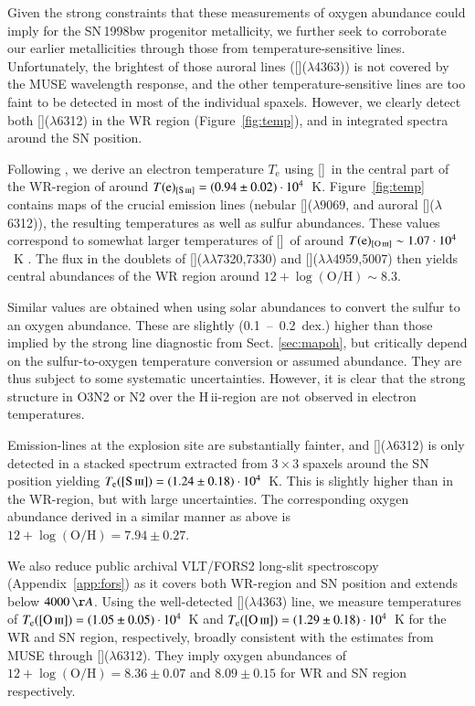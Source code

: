 \documentclass[traditabstract]{aa}
\newcommand{\hii}{\mbox{H\,{\sc ii}}}
\newcommand{\oh}{12+\log(\mathrm{O/H})}
\newcommand{\siii}{[\ion{S}{iii}]}
\newcommand{\oii}{[\ion{O}{ii}]}
\newcommand{\oiii}{[\ion{O}{iii}]}
\begin{document}
Given the strong constraints that these measurements of oxygen abundance could imply for the SN\,1998bw progenitor metallicity, we further seek to corroborate our earlier metallicities through those from temperature-sensitive lines. Unfortunately, the brightest of those auroral lines (\oiii($\lambda$4363)) is not covered by the MUSE wavelength response, and the other temperature-sensitive lines are too faint to be detected in most of the individual spaxels. However, we clearly detect both \siii($\lambda$6312) in the WR region (Figure~\ref{fig:temp}), and in integrated spectra around the SN position.



Following \citet{2013ApJS..207...21N}, we derive an electron temperature $T_{\mathrm{e}}$ using \siii\, in the central part of the WR-region of around $T(\mathrm{e})_{\siii}=(0.94\pm0.02)\cdot10^{4}$~K. Figure~\ref{fig:temp} contains maps of the crucial emission lines (nebular \siii($\lambda9069$, and auroral \siii($\lambda$6312)), the resulting temperatures as well as sulfur abundances. These values correspond to somewhat larger temperatures of \oiii~of around $T(\mathrm{e})_{\oiii} \sim 1.07\cdot10^{4}$~K \citep{2006A&A...448..955I, 2012A&A...547A..29B}. The flux in the doublets of \oii($\lambda\lambda$7320,7330) and \oiii($\lambda\lambda$4959,5007) then yields central abundances of the WR region around $\oh \sim 8.3$.

Similar values are obtained when using solar abundances to convert the sulfur to an oxygen abundance. These are slightly (0.1~--~0.2~dex.) higher than those implied by the strong line diagnostic from Sect. \ref{sec:mapoh}, but critically depend on the sulfur-to-oxygen temperature conversion or assumed abundance. They are thus subject to some systematic uncertainties. However, it is clear that the strong structure in O3N2 or N2 over the \hii-region are not observed in electron temperatures.

Emission-lines at the explosion site are substantially fainter, and \siii($\lambda$6312) is only detected in a stacked spectrum extracted from $3\times3$ spaxels around the SN position yielding $T_{\mathrm{e}}(\siii)=(1.24\pm0.18)\cdot10^{4}$~K. This is slightly higher than in the WR-region, but with large uncertainties. The corresponding oxygen abundance derived in a similar manner as above is $\oh=7.94\pm0.27$.

We also reduce public archival VLT/FORS2 long-slit spectroscopy (Appendix~\ref{app:fors}) as it covers both WR-region and SN position and extends below $4000\,\AA$. Using the well-detected \oiii($\lambda$4363) line, we measure temperatures of $T_{\mathrm{e}}(\oiii)=(1.05\pm0.05)\cdot 10^{4}$~K and $T_{\mathrm{e}}(\oiii)=(1.29\pm0.18)\cdot10^{4}$~K for the WR and SN region, respectively, broadly consistent with the estimates from MUSE through \siii($\lambda$6312). They imply oxygen abundances of $\oh=8.36\pm0.07$ and $8.09\pm0.15$ for WR and SN region respectively.
\end{document}

